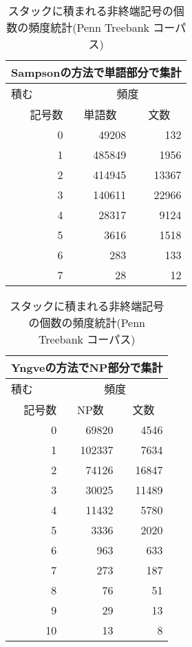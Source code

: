 \begin{table}[t]
\vspace{-1mm}
  \caption{スタックに積まれる非終端記号の個数の頻度統計(Penn Treebank コーパス)}
  \label{tab:hindo_toukei_engb}
  \begin{center}
\small\small\renewcommand{\arraystretch}{}
\begin{tabular}[t]{|r|r|r|}
\multicolumn{3}{c}{Sampsonの方法で単語部分で集計}\\\hline
\multicolumn{1}{|l|}{積む}& \multicolumn{2}{c|}{頻度}\\\cline{2-3}
記号数     &   \multicolumn{1}{c|}{単語数} & \multicolumn{1}{c|}{文数}\\\hline
0 & 49208 & 132\\
1 & 485849 & 1956\\
2 & 414945 & 13367\\
3 & 140611 & 22966\\
4 & 28317 & 9124\\
5 & 3616 & 1518\\
6 & 283 & 133\\
7 & 28 & 12\\\hline
\end{tabular}
\end{center}
\end{table}
\begin{table}[t]
\vspace{-0.5mm}
  \caption{スタックに積まれる非終端記号の個数の頻度統計(Penn Treebank コーパス)}
  \label{tab:hindo_toukei_engc}
\vspace{-2mm}
  \begin{center}
\small\small\renewcommand{\arraystretch}{}
\begin{tabular}[t]{|r|r|r|}
\multicolumn{3}{c}{Yngveの方法でNP部分で集計}\\\hline
\multicolumn{1}{|l|}{積む}& \multicolumn{2}{c|}{頻度}\\\cline{2-3}
記号数     &   \multicolumn{1}{c|}{NP数} & \multicolumn{1}{c|}{文数}\\\hline
0 & 69820 & 4546\\
1 & 102337 & 7634\\
2 & 74126 & 16847\\
3 & 30025 & 11489\\
4 & 11432 & 5780\\
5 & 3336 & 2020\\
6 & 963 & 633\\
7 & 273 & 187\\
8 & 76 & 51\\
9 & 29 & 13\\
10 & 13 & 8\\\hline
\end{tabular}
\end{center}
\vspace{-3mm}
\end{table}



